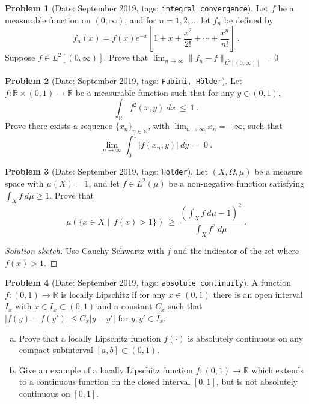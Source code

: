 \documentclass[11pt, notitlepage]{article}
\theoremstyle{definition}
\theoremstyle{definition}
\theoremstyle{definition}
\newtheorem{probstate}{Problem}
\theoremstyle{remark}
\newenvironment{problem}[2]{
    \begin{probstate}[Date: #1, tags: \texttt{#2}]
}
{
  \end{probstate}
}
\newenvironment{sketch}{
    \begin{proof}[Solution sketch]
}
{
    \end{proof}
}
\begin{document}
\begin{problem}{September 2019}{integral convergence}
  Let  $f$ be a measurable function on $(0,\infty)$, and for $n=1,2,\ldots$ let
$f_n$ be defined by
$$
f_n(x)=f(x)e^{-x}\left[1+x+\frac{x^2}{2!}+\cdots+\frac{x^n}{n!}\right] \ .
$$
Suppose $f \in L^2[(0,\infty)]$. Prove that $\lim_{n\to \infty}\|f_n-f\|_{L^2[(0,\infty)]}=0$
\end{problem}

\begin{problem}{September 2019}{Fubini, Hölder}
    Let $f:\mathbb{R}\times (0,1)\to\mathbb{R}$ be a measurable function such that for any $y\in(0,1)$,
$$\int_{\mathbb{R}} f^2(x,y) \ dx \ \le \ 1\  .
$$
Prove there exists a sequence $\{x_n\}_{n\in\mathbb{N}}$, with $\lim_{n\to\infty}x_n=+\infty$, such that
$$\lim_{n\to\infty} \int_0^1 |f(x_n,y)| \ dy \ = \ 0 \  .
$$
\end{problem}

\begin{problem}{September 2019}{Hölder}
  Let $(X,\Omega,\mu)$ be a measure space with $\mu(X)=1$, and let $f\in L^2(\mu)$ be a non-negative function satisfying $\int_X f \ d\mu\ge 1$. Prove that
$$
\mu\left(\{x\in X  \mid \ f(x)>1\}\right) \ \ge \  \frac{\left(\int_{X} f \ d\mu-1\right)^2}{\int_X f^2 \ d\mu} \ .
$$
\end{problem}

\begin{sketch}
Use Cauchy-Schwartz with $f$ and the indicator of the set where $f(x) > 1$.
\end{sketch}

\begin{problem}{September 2019}{absolute continuity}
   A function $f:(0,1)\to\mathbb{R}$ is locally Lipschitz if for   any $x\in(0,1)$ there is an open interval $I_x$ with $x\in I_x\subset (0,1)$ and a constant $C_x$ such that $|f(y)-f(y')|\le C_x|y-y'|$ for $y,y'\in I_x$.

\begin{enumerate}[(a)]
\item Prove that a locally Lipschitz function $f(\cdot)$ is absolutely continuous on any compact subinterval
$[a,b]\subset (0,1)$.

\item  Give an example of a locally Lipschitz function $f:(0,1)\to\mathbb{R}$ which extends to a continuous function on the closed interval $[0,1]$, but is not absolutely continuous on $[0,1]$.
\end{enumerate}
\end{problem}
\end{document}
